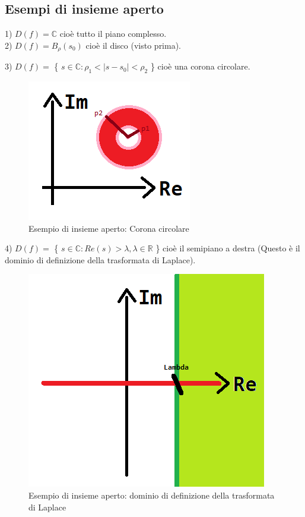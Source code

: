 \subsection{Esempi di insieme aperto}
1) $ D(f) = \mathbb{C} $ cioè tutto il piano complesso.\\
2) $ D(f) = B_{\rho}(s_{0})$ cioè il disco (visto prima).\\

\pagebreak

3) $ D(f) = $ \{ $ s \in \mathbb{C} : \rho_{1} < |s-s_{0}| < \rho_{2} $ \} cioè una corona circolare. \\
\begin{figure}[h]
	\centering
	\includegraphics[scale=0.75]{immagini/coronaCircolare}
	\caption{ Esempio di insieme aperto: Corona circolare }
	\label{fig: coronaCircolare}
\end{figure}


4) $ D(f) = $ \{ $ s \in \mathbb{C} : Re(s)> \lambda, \lambda \in \mathbb{R} $ \} cioè il semipiano a destra (Questo è il dominio di definizione della trasformata di Laplace). \\

\begin{figure}[h]
	\centering
	\includegraphics[scale=0.75]{immagini/dominioDefLaplace}
	\caption{ Esempio di insieme aperto: dominio di definizione della trasformata di Laplace }
	\label{fig: dominioDefLaplace}
\end{figure}


